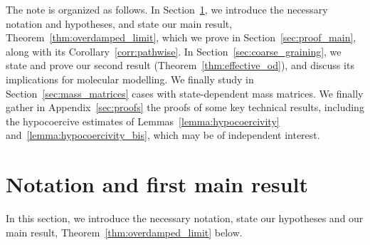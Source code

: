 \documentclass[10pt]{article}
\newcommand{\1}{\mathbbm 1}
\begin{document}
The note is organized as follows. In Section~\ref{sec:notation}, we introduce the necessary notation and hypotheses, and state our main result, Theorem~\ref{thm:overdamped_limit}, which we prove in Section~\ref{sec:proof_main}, along with its Corollary~\ref{corr:pathwise}.
In Section~\ref{sec:coarse_graining}, we state and prove our second result (Theorem~\ref{thm:effective_od}), and discuss its implications for molecular modelling. We finally study in Section~\ref{sec:mass_matrices} cases with state-dependent mass matrices.
We finally gather in Appendix~\ref{sec:proofs} the proofs of some key technical results, including the hypocoercive estimates of Lemmas~\ref{lemma:hypocoercivity} and~\ref{lemma:hypocoercivity_bis}, which may be of independent interest.

\section{Notation and first main result}
\label{sec:notation}
In this section, we introduce the necessary notation, state our hypotheses and our main result, Theorem~\ref{thm:overdamped_limit} below.
\end{document}
